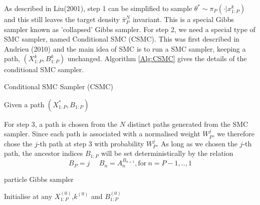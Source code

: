 \documentclass[12pt,a4paper]{article}
\begin{document}
As described in Liu(2001), step 1 can be simplified to sample $\theta^{*} \sim \pi_P(\cdot|x_{1:P}^k)$ and this still leaves the target density $\bar{\pi}_P^N$ invariant. This is a special Gibbs sampler known as 'collapsed' Gibbs sampler. For step 2, we need a special type of SMC sampler, named Conditional SMC (CSMC). This was first described in Andrieu (2010) and the main idea of SMC is to run a SMC sampler, keeping a path, $\left(X_{1:P}^k,B_{1:P}^k\right)$ unchanged. Algorithm \ref{Alg:CSMC} gives the details of the conditional SMC sampler. 

\begin{algorithm}
    \caption{Conditional SMC Sampler (CSMC)}
    Given a path $\left(X_{1:P}^{*},B_{1:P}\right)$\;
    \label{Alg:CSMC}
\end{algorithm}

For step 3, a path is chosen from the $N$ distinct paths generated from the SMC sampler. Since each path is associated with a normalised weight $W_P^j$, we therefore chose the $j$-th path at step 3 with probability $W_P^j$. As long as we chosen the $j$-th path, the ancestor indices $B_{1:P}$ will be set deterministically by the relation 
$$B_P = j\ \ \ \ \ \ B_n = A_{n}^{B_{n+1}},\text{for}\  n= P-1,..,1$$
\begin{algorithm}[htb!]
    \caption{particle Gibbs sampler}
        Initialise at any $X_{1:P}^{(0)}$,$k^{(0)}$ and $B_{1:P}^{(0)}$\;
    \label{Alg: PG}
    \end{algorithm}
\end{document}

